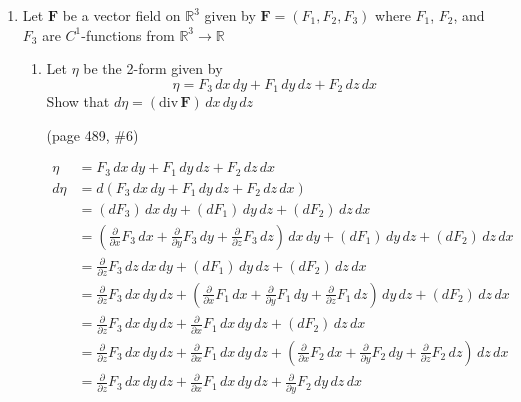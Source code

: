 \documentclass{article}
\newcommand{\parti}[1]{\frac{\partial}{\partial #1}}
\newcommand{\divt}{\text{div} \,}
\begin{document}
\thispagestyle{fancy}
\begin{enumerate}
    \item Let $\boldsymbol F$ be a vector field on $\mathbb{R}^3$ given by $\boldsymbol F = (F_1, F_2, F_3)$ where $F_1$, $F_2$, and $F_3$ are $C^1$-functions from $\mathbb{R}^3 \rightarrow \mathbb{R}$
    \begin{enumerate}
        \item Let $\eta$ be the 2-form given by
            \[ \eta = F_3 \, dx \, dy + F_1 \, dy \, dz + F_2 \, dz \, dx \]
            Show that $d\eta = (\divt \boldsymbol F) \, dx \, dy \, dz$
            
            (page 489, \#6)

            \begin{align*} 
                \eta &= F_3 \, dx \, dy 
                + F_1 \, dy \, dz 
                + F_2 \, dz \, dx \\
                d\eta &= d(F_3 \, dx \, dy 
                + F_1 \, dy \, dz 
                + F_2 \, dz \, dx) \\
                &= (dF_3)\, dx \, dy 
                + (dF_1) \, dy \, dz 
                + (dF_2) \, dz \, dx \\
                &= (\parti{x} F_3 \,dx 
                + \parti{y} F_3 \, dy 
                + \parti{z} F_3  \, dz)\, dx \, dy 
                + (dF_1) \, dy \, dz 
                + (dF_2) \, dz \, dx \\
                &= \parti{z} F_3  \, dz \, dx \, dy 
                + (dF_1) \, dy \, dz 
                + (dF_2) \, dz \, dx \\
                &= \parti{z} F_3  \, dx \, dy \, dz 
                + (\parti{x} F_1 \,dx 
                + \parti{y} F_1 \, dy 
                + \parti{z} F_1  \, dz) \, dy \, dz 
                + (dF_2) \, dz \, dx \\
                &= \parti{z} F_3  \, dx \, dy \, dz 
                + \parti{x} F_1 \,dx \, dy \, dz 
                + (dF_2) \, dz \, dx \\
                &= \parti{z} F_3  \, dx \, dy \, dz 
                + \parti{x} F_1 \,dx \, dy \, dz 
                + (\parti{x} F_2 \,dx 
                + \parti{y} F_2 \, dy 
                + \parti{z} F_2  \, dz) \, dz \, dx \\
                &= \parti{z} F_3  \, dx \, dy \, dz 
                + \parti{x} F_1 \,dx \, dy \, dz 
                + \parti{y} F_2 \, dy \, dz \, dx \\

\end{align*}
\end{enumerate}
\end{enumerate}
\end{document}
